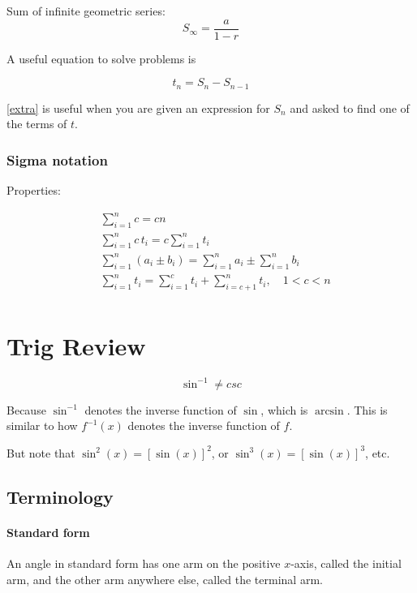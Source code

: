 \documentclass{article}
\numberwithin{equation}{section}
\begin{document}
\bigskip
\noindent
Sum of infinite geometric series:
\begin{equation}
	 S_\infty = \frac{a}{1-r}
\end{equation}


\noindent
A useful equation to solve problems is

\begin{equation} \label{extra}
	t_n = S_n - S_{n-1}
\end{equation}

\eqref{extra} is useful when you are given an expression for $S_n$ and asked to find one of the terms of $t$.

\subsubsection{Sigma notation}
Properties:

\begin{align}
	&\sum_{i=1}^n c = cn \\
	&\sum_{i=1}^n c \,t_i = c \sum_{i=1}^n t_i \\
	&\sum_{i=1}^n (a_i \pm b_i) = \sum_{i=1}^n a_i \pm \sum_{i=1}^n b_i \\
	&\sum_{i=1}^n t_i = \sum_{i=1}^c t_i + \sum_{i=c+1}^n t_i , \quad 1 < c < n \\
\end{align}

\section{Trig Review}
\begin{equation*}
	\sin^{-1} \ne csc
\end{equation*}

Because $\sin^{-1}$ denotes the inverse function of $\sin$, which is $\arcsin$. This is similar to how $f^{-1}(x)$ denotes the inverse function of $f$.

But note that $\sin^2(x) = [ \sin(x) ]^2$, or $\sin^3(x) = [\sin(x)]^3$, etc.

\subsection{Terminology}
\paragraph{Standard form} An angle in standard form has one arm on the positive $x$-axis, called the initial arm, and the other arm anywhere else, called the terminal arm.
\end{document}
